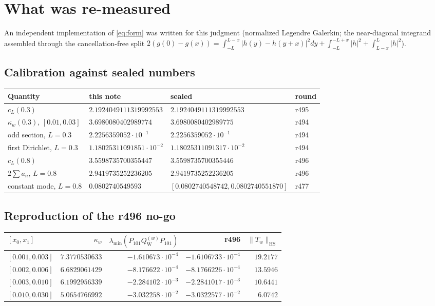 \documentclass[11pt]{article}
\theoremstyle{remark}
\newcommand{\QW}{Q_{\mathrm W}}
\begin{document}
\section{What was re-measured}\label{sec:remeas}

An independent implementation of \eqref{eq:form} was written for this
judgment (normalized Legendre Galerkin; the near-diagonal integrand
assembled through the cancellation-free split
$2(g(0)-g(x))=\int_{-L}^{L-x}|h(y)-h(y+x)|^2dy
+\int_{-L}^{-L+x}|h|^2+\int_{L-x}^{L}|h|^2$).

\subsection{Calibration against sealed numbers}

\begin{center}
\small
\begin{tabular}{@{}llll@{}}
\toprule
Quantity & this note & sealed & round \\
\midrule
$c_L(0.3)$ & $2.1924049111319992553$
  & $2.1924049111319992553$ & r495 \\
$\kappa_w(0.3)$, $[0.01,0.03]$ & $3.6980080402989774$
  & $3.6980080402989775$ & r494 \\
odd section, $L=0.3$ & $2.2256359052\cdot10^{-1}$
  & $2.2256359052\cdot10^{-1}$ & r494 \\
first Dirichlet, $L=0.3$ & $1.18025311091851\cdot10^{-2}$
  & $1.18025311091317\cdot10^{-2}$ & r494 \\
$c_L(0.8)$ & $3.5598735700355447$
  & $3.5598735700355446$ & r496 \\
$2\sum a_n$, $L=0.8$ & $2.9419735252236205$
  & $2.9419735252236205$ & r496 \\
constant mode, $L=0.8$ & $0.0802740549593$
  & $[0.0802740548742,0.0802740551870]$ & r477 \\
\bottomrule
\end{tabular}
\end{center}

\subsection{Reproduction of the r496 no-go}

\begin{center}
\small
\begin{tabular}{@{}lrrrr@{}}
\toprule
$[x_0,x_1]$ & $\kappa_w$
  & $\lambda_{\min}(P_{101}\QW^{(w)}P_{101})$
  & r496 & $\|T_w\|_{\mathrm{HS}}$ \\
\midrule
$[0.001,0.003]$ & $7.3770530633$ & $-1.610673\cdot10^{-4}$
  & $-1.6106733\cdot10^{-4}$ & $19.2177$ \\
$[0.002,0.006]$ & $6.6829061429$ & $-8.176622\cdot10^{-4}$
  & $-8.1766226\cdot10^{-4}$ & $13.5946$ \\
$[0.003,0.010]$ & $6.1992956339$ & $-2.284102\cdot10^{-3}$
  & $-2.2841017\cdot10^{-3}$ & $10.6441$ \\
$[0.010,0.030]$ & $5.0654766992$ & $-3.032258\cdot10^{-2}$
  & $-3.0322577\cdot10^{-2}$ & $6.0742$ \\
\bottomrule
\end{tabular}
\end{center}
\end{document}
